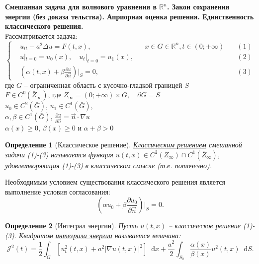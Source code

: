 \documentclass[12pt, a4paper]{article}
\newcommand{\R}{\mathbb{R}}
\newcommand{\dd}{\mathop{}\!\mathrm{d}} %
\newtheorem{definition}[theorem]{Определение}
\renewcommand{\proofname}{Доказательство}
\begin{document}
\newtheorem{theorem}{Теорема}
\newtheorem{definition}{Определение}
\newtheorem{lemma}{Лемма}
\newenvironment{proof}[1][\proofname]{\par\noindent\textit{#1.}\quad}{\hfill$\square$}
\renewcommand{\proofname}{Доказательство}


{\Large \textbf{Смешанная задача для волнового уравнения в $\R^n$. Закон сохранения энергии (без доказа
тельства). Априорная оценка решения. Единственность классического решения.}}
\\
Рассматривается задача:
$$
\left\{
\begin{aligned}
&u_{tt} - a^2 \Delta u = F(t,x), && x \in G \in \R^n, t \in (0;+\infty) \quad &(1) \\
&u|_{t=0} = u_0(x), \quad u_t|_{t=0} = u_1(x), &&& (2) \\
&\left(\alpha (t,x) + \beta \frac{\partial u}{\partial \vec{n}}\right)\Big|_S = 0, &&&(3)
\end{aligned}
\right.
$$
где $G$ -- ограниченная область с кусочно-гладкой границей $S$ \\
$F \in C^0(\bar Z_\infty)$, где $Z_\infty = (0;+\infty) \times G, \quad \partial G = S$ \\
$u_0 \in C^2(\bar{G})$, $u_1 \in C^1(\bar{G})$, \\
$\alpha, \beta \in C^1(\bar{G})$, $\frac{\partial u}{\partial \vec n } = \vec{n} \cdot \nabla u$ \\
$\alpha(x) \geq 0$, $\beta(x) \geq 0$ и $\alpha + \beta > 0$ \\

\begin{definition}[Классическое решение]
\label{def:classical_solution}
\underline{Классическим решением} смешанной задачи (1)-(3) называется функция $u(t,x) \in C^2(Z_\infty) \cap C^1(\bar{Z}_\infty)$, удовлетворяющая (1)-(3) в классическом смысле (т.е. поточечно).
\end{definition}

Необходимым условием существования классического решения является выполнение условия согласования:
\begin{equation*}
\left(\alpha u_0 + \beta \frac{\partial u_0}{\partial \vec{n}}\right)\Big|_S = 0.
\end{equation*}

\begin{definition}[Интеграл энергии]
\label{def:energy_integral}
Пусть $u(t,x)$ -- классическое решение (1)-(3). Квадратом \underline{интеграла энергии} называется величина:
\begin{equation*}
\mathcal{J}^2(t) = \frac{1}{2} \int_G [u_t^2(t,x) + a^2 |\nabla u(t,x)|^2] \dd x + \frac{a^2}{2} \int_{S_0} \frac{\alpha(x)}{\beta(x)} u^2(t,x) \dd S.
\end{equation*}
\end{definition}
\end{document}
